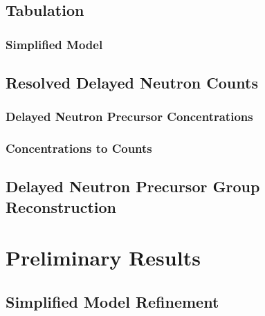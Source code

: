 \documentclass[edeposit,fullpage,hidelinks]{uiucthesis2018}
\begin{document}
\section{Tabulation}


\subsection{Simplified Model}
\label{sec:simple-model}



\section{Resolved Delayed Neutron Counts}
\label{sec:delnu-counts}



\subsection{Delayed Neutron Precursor Concentrations}


\subsection{Concentrations to Counts}


\section{Delayed Neutron Precursor Group Reconstruction}
\label{sec:delnu-groups}





\chapter{Preliminary Results}



\section{Simplified Model Refinement}
\label{sec:model-refinement}
\end{document}
